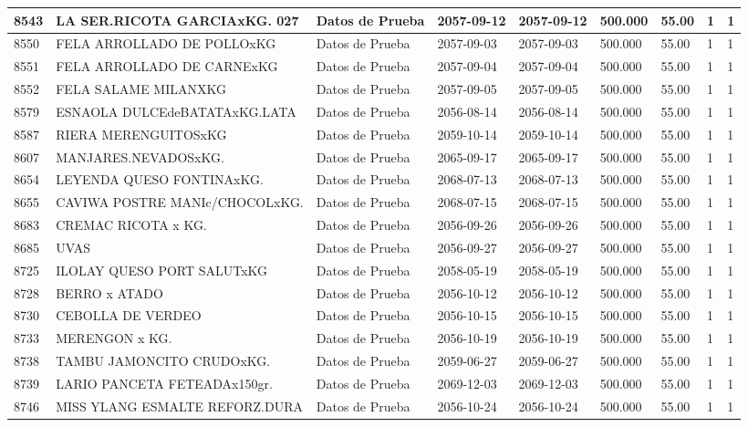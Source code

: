 \documentclass[a4paper,12pt]{article}
\begin{document}
\begin{landscape}
\begin{longtable}{|p{4cm}|p{2.5cm}|p{2.5cm}|p{1.8cm}|p{1.8cm}|p{1cm}|p{1cm}|p{3cm}|p{3cm}||}
8543 & LA SER.RICOTA GARCIAxKG.   027 & Datos de Prueba & 2057-09-12 & 2057-09-12 & 500.000 & 55.00 & 1 & 1 \\ \hline 
8550 & FELA ARROLLADO DE POLLOxKG & Datos de Prueba & 2057-09-03 & 2057-09-03 & 500.000 & 55.00 & 1 & 1 \\ \hline 
8551 & FELA ARROLLADO DE CARNExKG & Datos de Prueba & 2057-09-04 & 2057-09-04 & 500.000 & 55.00 & 1 & 1 \\ \hline 
8552 & FELA SALAME MILANXKG & Datos de Prueba & 2057-09-05 & 2057-09-05 & 500.000 & 55.00 & 1 & 1 \\ \hline 
8579 & ESNAOLA DULCEdeBATATAxKG.LATA & Datos de Prueba & 2056-08-14 & 2056-08-14 & 500.000 & 55.00 & 1 & 1 \\ \hline 
8587 & RIERA MERENGUITOSxKG & Datos de Prueba & 2059-10-14 & 2059-10-14 & 500.000 & 55.00 & 1 & 1 \\ \hline 
8607 & MANJARES.NEVADOSxKG. & Datos de Prueba & 2065-09-17 & 2065-09-17 & 500.000 & 55.00 & 1 & 1 \\ \hline 
8654 & LEYENDA QUESO FONTINAxKG. & Datos de Prueba & 2068-07-13 & 2068-07-13 & 500.000 & 55.00 & 1 & 1 \\ \hline 
8655 & CAVIWA POSTRE MANIc/CHOCOLxKG. & Datos de Prueba & 2068-07-15 & 2068-07-15 & 500.000 & 55.00 & 1 & 1 \\ \hline 
8683 & CREMAC RICOTA x KG. & Datos de Prueba & 2056-09-26 & 2056-09-26 & 500.000 & 55.00 & 1 & 1 \\ \hline 
8685 & UVAS & Datos de Prueba & 2056-09-27 & 2056-09-27 & 500.000 & 55.00 & 1 & 1 \\ \hline 
8725 & ILOLAY QUESO PORT SALUTxKG & Datos de Prueba & 2058-05-19 & 2058-05-19 & 500.000 & 55.00 & 1 & 1 \\ \hline 
8728 & BERRO x ATADO & Datos de Prueba & 2056-10-12 & 2056-10-12 & 500.000 & 55.00 & 1 & 1 \\ \hline 
8730 & CEBOLLA DE VERDEO & Datos de Prueba & 2056-10-15 & 2056-10-15 & 500.000 & 55.00 & 1 & 1 \\ \hline 
8733 & MERENGON x KG. & Datos de Prueba & 2056-10-19 & 2056-10-19 & 500.000 & 55.00 & 1 & 1 \\ \hline 
8738 & TAMBU JAMONCITO CRUDOxKG. & Datos de Prueba & 2059-06-27 & 2059-06-27 & 500.000 & 55.00 & 1 & 1 \\ \hline 
8739 & LARIO PANCETA FETEADAx150gr. & Datos de Prueba & 2069-12-03 & 2069-12-03 & 500.000 & 55.00 & 1 & 1 \\ \hline 
8746 & MISS YLANG ESMALTE REFORZ.DURA & Datos de Prueba & 2056-10-24 & 2056-10-24 & 500.000 & 55.00 & 1 & 1 \\ \hline 

\end{longtable}
\end{landscape}
\end{document}
